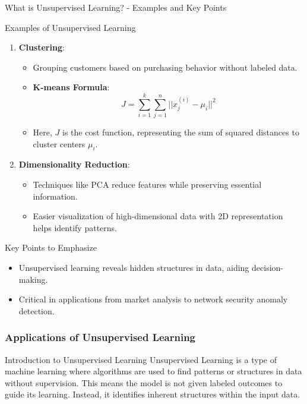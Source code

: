 \documentclass[aspectratio=169]{beamer}
\begin{document}
\begin{frame}[fragile]{What is Unsupervised Learning? - Examples and Key Points}
    \begin{block}{Examples of Unsupervised Learning}
        \begin{enumerate}
            \item \textbf{Clustering}:
                \begin{itemize}
                    \item Grouping customers based on purchasing behavior without labeled data.
                    \item \textbf{K-means Formula}: 
                    \begin{equation}
                        J = \sum_{i=1}^{k} \sum_{j=1}^{n} ||x_j^{(i)} - \mu_i||^2
                    \end{equation}
                    \item Here, $J$ is the cost function, representing the sum of squared distances to cluster centers $\mu_i$.
                \end{itemize}
            \item \textbf{Dimensionality Reduction}:
                \begin{itemize}
                    \item Techniques like PCA reduce features while preserving essential information.
                    \item Easier visualization of high-dimensional data with 2D representation helps identify patterns.
                \end{itemize}
        \end{enumerate}
    \end{block}

    \begin{block}{Key Points to Emphasize}
        \begin{itemize}
            \item Unsupervised learning reveals hidden structures in data, aiding decision-making.
            \item Critical in applications from market analysis to network security anomaly detection.
        \end{itemize}
    \end{block}
\end{frame}

\begin{frame}[fragile]
  \frametitle{Applications of Unsupervised Learning}
  \begin{block}{Introduction to Unsupervised Learning}
    Unsupervised Learning is a type of machine learning where algorithms are used to find patterns or structures in data without supervision. This means the model is not given labeled outcomes to guide its learning. Instead, it identifies inherent structures within the input data. 
  \end{block}
\end{frame}
\end{document}
